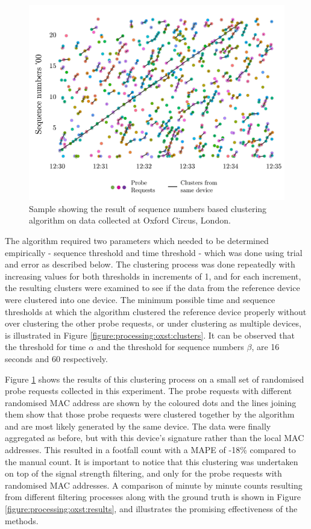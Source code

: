 \begin{figure}
  \includegraphics[trim={3 3 3 3},clip]{images/processing-oxst-fingerprinting.jpg}
  \caption{Sample showing the result of sequence numbers based clustering algorithm on data collected at Oxford Circus, London.}
  \label{figure:processing:oxst:fingerprinting}
\end{figure}

The algorithm required two parameters which needed to be determined empirically - sequence threshold and time threshold - which was done using trial and error as described below.
The clustering process was done repeatedly with increasing values for both thresholds in increments of 1, and for each increment, the resulting clusters were  examined to see if the data from the reference device were clustered into one device.
The minimum possible time and sequence thresholds at which the algorithm clustered the reference device properly without over clustering the other probe requests, or under clustering as multiple devices, is illustrated in Figure \ref{figure:processing:oxst:clusters}.
It can be observed that the threshold for time $\alpha$ and the threshold for sequence numbers $\beta$, are 16 seconds and 60 respectively.

Figure \ref{figure:processing:oxst:fingerprinting} shows the results of this clustering process on a small set of randomised probe requests collected in this experiment.
The probe requests with different randomised MAC address are shown by the coloured dots and the lines joining them show that those probe requests were clustered together by the algorithm and are most likely generated by the same device.
The data were finally aggregated as before, but with this device’s signature rather than the local MAC addresses.
This resulted in a footfall count with a MAPE of -18\% compared to the manual count.
It is important to notice that this clustering was undertaken on top of the signal strength filtering, and only for the probe requests with randomised MAC addresses.
A comparison of minute by minute counts resulting from different filtering processes along with the ground truth is shown in Figure \ref{figure:processing:oxst:results}, and illustrates the promising effectiveness of the methods.

